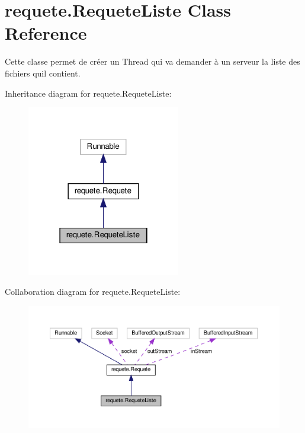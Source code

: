 \hypertarget{classrequete_1_1RequeteListe}{}\section{requete.\+Requete\+Liste Class Reference}
\label{classrequete_1_1RequeteListe}


Cette classe permet de créer un Thread qui va demander à un serveur la liste des fichiers qu\textquotesingle{}il contient.  




Inheritance diagram for requete.\+Requete\+Liste\+:
\nopagebreak
\begin{figure}[H]
\begin{center}
\leavevmode
\includegraphics[width=190pt]{classrequete_1_1RequeteListe__inherit__graph}
\end{center}
\end{figure}


Collaboration diagram for requete.\+Requete\+Liste\+:
\nopagebreak
\begin{figure}[H]
\begin{center}
\leavevmode
\includegraphics[width=350pt]{classrequete_1_1RequeteListe__coll__graph}
\end{center}
\end{figure}
